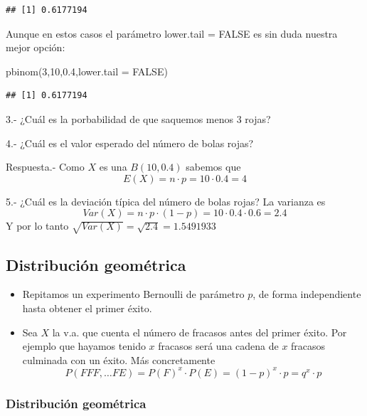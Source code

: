\documentclass[
]{article}
\newenvironment{Shaded}{\begin{snugshade}}{\end{snugshade}}
\newcommand{\AttributeTok}[1]{\textcolor[rgb]{0.77,0.63,0.00}{#1}}
\newcommand{\ConstantTok}[1]{\textcolor[rgb]{0.00,0.00,0.00}{#1}}
\newcommand{\DecValTok}[1]{\textcolor[rgb]{0.00,0.00,0.81}{#1}}
\newcommand{\FloatTok}[1]{\textcolor[rgb]{0.00,0.00,0.81}{#1}}
\newcommand{\FunctionTok}[1]{\textcolor[rgb]{0.00,0.00,0.00}{#1}}
\newcommand{\NormalTok}[1]{#1}
\begin{document}
\begin{verbatim}
## [1] 0.6177194
\end{verbatim}

Aunque en estos casos el parámetro lower.tail = FALSE es sin duda
nuestra mejor opción:

\begin{Shaded}
\begin{Highlighting}[]
\FunctionTok{pbinom}\NormalTok{(}\DecValTok{3}\NormalTok{,}\DecValTok{10}\NormalTok{,}\FloatTok{0.4}\NormalTok{,}\AttributeTok{lower.tail =} \ConstantTok{FALSE}\NormalTok{)}
\end{Highlighting}
\end{Shaded}

\begin{verbatim}
## [1] 0.6177194
\end{verbatim}

3.- ¿Cuál es la porbabilidad de que saquemos menos 3 rojas?

4.- ¿Cuál es el valor esperado del número de bolas rojas?

Respuesta.- Como \(X\) es una \(B(10,0.4)\) sabemos que
\[E(X) = n\cdot p = 10 \cdot 0.4 = 4\]

5.- ¿Cuál es la deviación típica del número de bolas rojas? La varianza
es \[Var(X) = n\cdot p \cdot (1-p) = 10\cdot 0.4 \cdot 0.6 = 2.4\] Y por
lo tanto \(\sqrt{Var(X)} = \sqrt{2.4} = 1.5491933\)

\hypertarget{distribuciuxf3n-geomuxe9trica}{%
\subsection{Distribución
geométrica}\label{distribuciuxf3n-geomuxe9trica}}

\begin{itemize}
  \item Repitamos un experimento Bernoulli de parámetro $p$, de forma independiente hasta obtener el primer éxito.
  \item Sea $X$ la v.a. que cuenta el número de fracasos antes del primer éxito. Por ejemplo que hayamos tenido $x$ fracasos será una cadena de $x$ fracasos culminada con un éxito. Más concretamente
  $$P(FFF, \ldots FE) = P(F)^x \cdot P(E) = (1-p)^x \cdot p = q^x \cdot p$$
  
\end{itemize}

\hypertarget{distribuciuxf3n-geomuxe9trica-1}{%
\subsubsection{Distribución
geométrica}\label{distribuciuxf3n-geomuxe9trica-1}}
\end{document}
